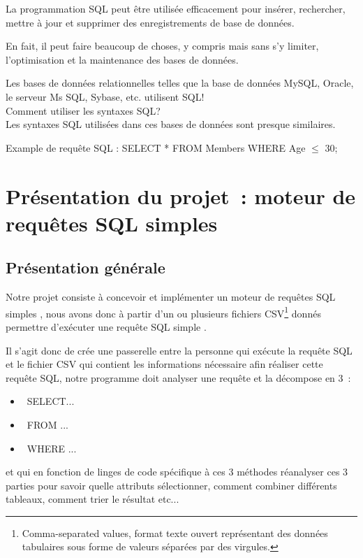 \documentclass[oneside,13pt,a4paper]{report}
\begin{document}
            La programmation SQL peut être utilisée efficacement pour insérer, rechercher, mettre à jour et supprimer des enregistrements de base de données.

            En fait, il peut faire beaucoup de choses, y compris mais sans s'y limiter, l'optimisation et la maintenance des bases de données.

            Les bases de données relationnelles telles que la base de données MySQL, Oracle, le serveur Ms SQL, Sybase, etc. utilisent SQL!\\
            Comment utiliser les syntaxes SQL? \\
            Les syntaxes SQL utilisées dans ces bases de données sont presque similaires.

            Example de requête SQL : SELECT * FROM Members WHERE Age $ \leq $ 30;

    \chapter{Présentation du projet : moteur de requêtes SQL simples}

    \section{Présentation générale}

        Notre projet consiste à concevoir et implémenter un moteur de requêtes SQL simples , nous avons donc à partir d’un ou plusieurs fichiers CSV\footnote{Comma-separated values, format texte ouvert représentant des données tabulaires sous forme de valeurs séparées par des virgules.} donnés permettre d’exécuter une requête SQL simple .

        Il s’agit donc de crée une passerelle entre la personne qui exécute la requête SQL et le fichier CSV qui contient les informations nécessaire afin réaliser cette requête SQL, 
        notre programme doit analyser une requête et la décompose en 3 : 
        \begin{itemize}
            \item SELECT...
            \item FROM ...
            \item WHERE ...
        \end{itemize}
        et qui en fonction de linges de code spécifique à ces 3 méthodes réanalyser ces 3 parties pour savoir quelle attributs sélectionner, 
        comment combiner différents tableaux, comment trier le résultat etc... 
\end{document}
